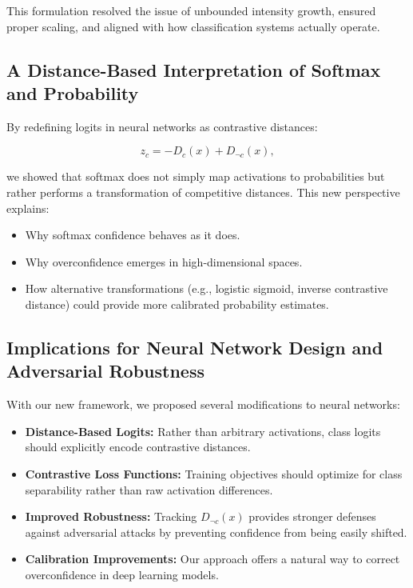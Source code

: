 This formulation resolved the issue of unbounded intensity growth, ensured proper scaling, and aligned with how classification systems actually operate.

\subsection{A Distance-Based Interpretation of Softmax and Probability}

By redefining logits in neural networks as contrastive distances:

\[
z_c = -D_c(x) + D_{\neg c}(x),
\]

we showed that softmax does not simply map activations to probabilities but rather performs a transformation of competitive distances. This new perspective explains:

\begin{itemize}
    \item Why softmax confidence behaves as it does.
    \item Why overconfidence emerges in high-dimensional spaces.
    \item How alternative transformations (e.g., logistic sigmoid, inverse contrastive distance) could provide more calibrated probability estimates.
\end{itemize}

\subsection{Implications for Neural Network Design and Adversarial Robustness}

With our new framework, we proposed several modifications to neural networks:

\begin{itemize}
    \item \textbf{Distance-Based Logits:} Rather than arbitrary activations, class logits should explicitly encode contrastive distances.
    \item \textbf{Contrastive Loss Functions:} Training objectives should optimize for class separability rather than raw activation differences.
    \item \textbf{Improved Robustness:} Tracking \( D_{\neg c}(x) \) provides stronger defenses against adversarial attacks by preventing confidence from being easily shifted.
    \item \textbf{Calibration Improvements:} Our approach offers a natural way to correct overconfidence in deep learning models.
\end{itemize}

